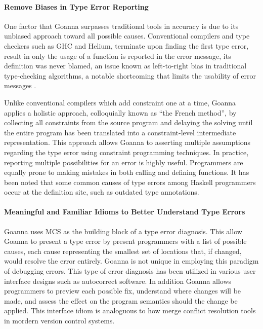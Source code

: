 \documentclass[pdflatex,sn-mathphys-num]{sn-jnl}%
\begin{document}
\paragraph{Remove Biases in Type Error Reporting}

One factor that Goanna surpasses traditional tools in accuracy is due to its unbiased approach toward all possible causes. Conventional compilers and type checkers such as GHC and Helium, terminate upon finding the first type error, result in only the usage of a function is reported in the error message, its definition was never blamed, an issue known as left-to-right bias in traditional type-checking algorithms, a notable shortcoming that limits the usability of error messages \cite{McAdam2002-vb, Lee1998-fx, Chen2014-ev}. 

Unlike conventional compilers which add constraint one at a time, Goanna applies a holistic approach, colloquially known as ``the French method'', by collecting all constraints from the source program and delaying the solving until the entire program has been translated into a constraint-level intermediate representation. This approach allows Goanna to asserting multiple assumptions regarding the type error using constraint programming techniques. In practice, reporting multiple possibilities for an error is highly useful. Programmers are equally prone to making mistakes in both calling and defining functions. It has been noted that some common causes of type errors among Haskell programmers occur at the definition site, such as outdated type annotations.

\paragraph{Meaningful and Familiar Idioms to Better Understand Type Errors}

Goanna uses MCS as the building block of a type error diagnosis. This allow Goanna to present a type error by present programmers with a list of possible causes, each cause representing the smallest set of locations that, if changed, would resolve the error entirely. Goanna is not unique in employing this paradigm of debugging errors. This type of error diagnosis has been utilized in various user interface designs such as autocorrect software. In addition Goanna allows programmers to preview each possible fix, understand where changes will be made, and assess the effect on the program semantics should the change be applied. This interface idiom is analoguous to how merge conflict resolution tools in mordern version control systems.
\end{document}
